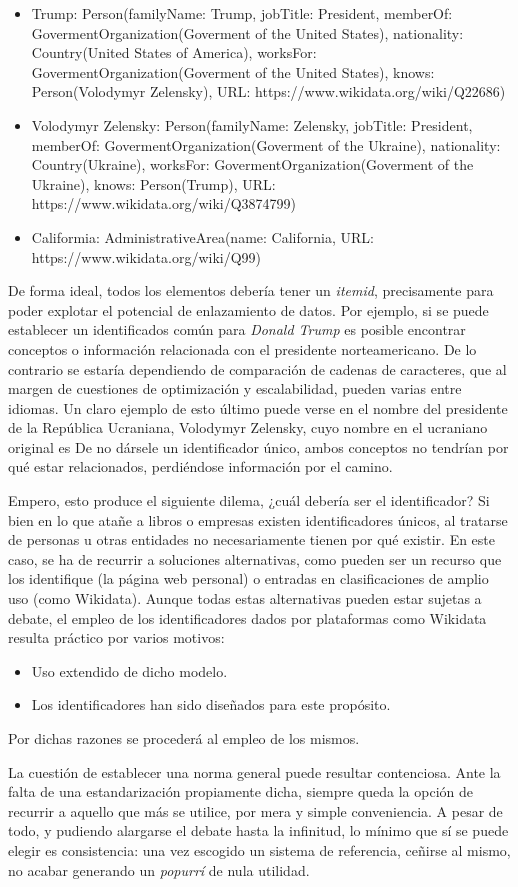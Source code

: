 \documentclass{report}
\begin{document}
\begin{itemize}
\item Trump: Person(familyName: Trump, jobTitle: President, memberOf: GovermentOrganization(Goverment of the United States), nationality: Country(United States of America), worksFor: GovermentOrganization(Goverment of the United States), knows: Person(Volodymyr Zelensky), URL: https://www.wikidata.org/wiki/Q22686)
\item Volodymyr Zelensky: Person(familyName: Zelensky, jobTitle: President, memberOf: GovermentOrganization(Goverment of the Ukraine), nationality: Country(Ukraine), worksFor: GovermentOrganization(Goverment of the Ukraine), knows: Person(Trump), URL: https://www.wikidata.org/wiki/Q3874799)
\item Califormia: AdministrativeArea(name: California, URL: https://www.wikidata.org/wiki/Q99)
\end{itemize}

De forma ideal, todos los elementos debería tener un \textit{itemid}, precisamente para poder explotar el potencial de enlazamiento de datos.
Por ejemplo, si se puede establecer un identificados común para \textit{Donald Trump} es posible encontrar conceptos o información relacionada con el presidente norteamericano.
De lo contrario se estaría dependiendo de comparación de cadenas de caracteres, que al margen de cuestiones de optimización y escalabilidad, pueden varias entre idiomas.
Un claro ejemplo de esto último puede verse en el nombre del presidente de la República Ucraniana, Volodymyr Zelensky, cuyo nombre en el ucraniano original es
De no dársele un identificador único, ambos conceptos no tendrían por qué estar relacionados, perdiéndose información por el camino.

Empero, esto produce el siguiente dilema, ¿cuál debería ser el identificador?
Si bien en lo que atañe a libros o empresas existen identificadores únicos, al tratarse de personas u otras entidades no necesariamente tienen por qué existir.
En este caso, se ha de recurrir a soluciones alternativas, como pueden ser un recurso que los identifique (la página web personal) o entradas en clasificaciones de amplio uso (como Wikidata).
Aunque todas estas alternativas pueden estar sujetas a debate, el empleo de los identificadores dados por plataformas como Wikidata resulta práctico por varios motivos:
\begin{itemize}
\item Uso extendido de dicho modelo.
\item Los identificadores han sido diseñados para este propósito.
\end{itemize}

Por dichas razones se procederá al empleo de los mismos.

La cuestión de establecer una norma general puede resultar contenciosa.
Ante la falta de una estandarización propiamente dicha, siempre queda la opción de recurrir a aquello que más se utilice, por mera y simple conveniencia.
A pesar de todo, y pudiendo alargarse el debate hasta la infinitud, lo mínimo que sí se puede elegir es consistencia: una vez escogido un sistema de referencia, ceñirse al mismo, no acabar generando un \textit{popurrí} de nula utilidad.
\end{document}
